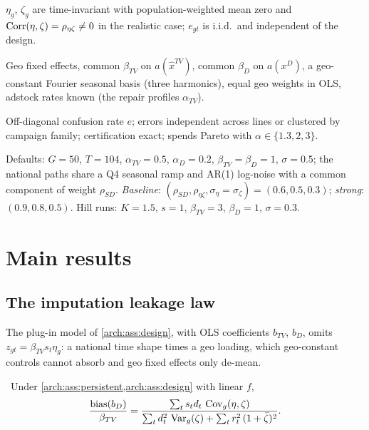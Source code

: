 \begin{assumption}
\label{arch:ass:persistent}
$\eta_g$, $\zeta_g$ are time-invariant with population-weighted mean zero and $\operatorname{Corr}(\eta,\zeta) = \rho_{\eta\zeta} \ne 0$ in the realistic case; $e_{gt}$ is i.i.d.\ and independent of the design.
\end{assumption}

\begin{assumption}
\label{arch:ass:design}
Geo fixed effects, common $\beta_{TV}$ on $a(\hat x^{TV})$, common $\beta_D$ on $a(x^D)$, a geo-constant Fourier seasonal basis (three harmonics), equal geo weights in OLS, adstock rates known (the repair profiles $\alpha_{TV}$).
\end{assumption}

\begin{assumption}
\label{arch:ass:audit}
Off-diagonal confusion rate $e$; errors independent across lines or clustered by campaign family; certification exact; spends Pareto with $\alpha \in \{1.3, 2, 3\}$.
\end{assumption}

Defaults: $G = 50$, $T = 104$, $\alpha_{TV} = 0.5$, $\alpha_D = 0.2$, $\beta_{TV} = \beta_D = 1$, $\sigma = 0.5$; the national paths share a Q4 seasonal ramp and AR(1) log-noise with a common component of weight $\rho_{SD}$. \emph{Baseline}: $(\rho_{SD}, \rho_{\eta\zeta}, \sigma_\eta = \sigma_\zeta) = (0.6, 0.5, 0.3)$; \emph{strong}: $(0.9, 0.8, 0.5)$. Hill runs: $K = 1.5$, $s = 1$, $\beta_{TV} = 3$, $\beta_D = 1$, $\sigma = 0.3$.

\section{Main results}

\subsection{The imputation leakage law}

The plug-in model of \cref{arch:ass:design}, with OLS coefficients $b_{TV}$, $b_D$, omits $z_{gt} = \beta_{TV}s_t\eta_g$: a national time shape times a geo loading, which geo-constant controls cannot absorb and geo fixed effects only de-mean.

\begin{theorem}
\label{arch:thm:leak}
\tagEstablished\ Under \cref{arch:ass:persistent,arch:ass:design} with linear $f$,
\begin{equation}
\frac{\mathrm{bias}(b_D)}{\beta_{TV}} = \frac{\sum_t s_td_t\,\operatorname{Cov}_g(\eta,\zeta)}{\sum_t d_t^2\,\operatorname{Var}_g(\zeta) + \sum_t r_t^2\,(1+\bar\zeta)^2}.
\label{arch:eq:leak}
\end{equation}
\end{theorem}

